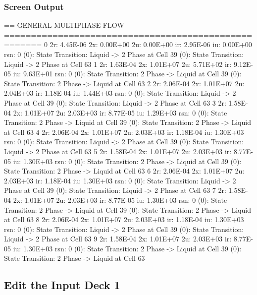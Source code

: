 \documentclass{beamer}
\begin{document}
\begin{frame}[fragile]\frametitle{Screen Output}

\begin{semiverbatim}
\tiny
== GENERAL MULTIPHASE FLOW =====================================================
  0 2r: 4.45E-06 2x: 0.00E+00 2u: 0.00E+00 ir: 2.95E-06 iu: 0.00E+00 rsn:   0
 (0): State Transition: Liquid -> 2 Phase at Cell       39
 (0): State Transition: Liquid -> 2 Phase at Cell       63
  1 2r: 1.63E-04 2x: 1.01E+07 2u: 5.71E+02 ir: 9.12E-05 iu: 9.63E+01 rsn:   0
 (0): State Transition: 2 Phase -> Liquid at Cell       39
 (0): State Transition: 2 Phase -> Liquid at Cell       63
  2 2r: 2.06E-04 2x: 1.01E+07 2u: 2.04E+03 ir: 1.18E-04 iu: 1.44E+03 rsn:   0
 (0): State Transition: Liquid -> 2 Phase at Cell       39
 (0): State Transition: Liquid -> 2 Phase at Cell       63
  3 2r: 1.58E-04 2x: 1.01E+07 2u: 2.03E+03 ir: 8.77E-05 iu: 1.29E+03 rsn:   0
 (0): State Transition: 2 Phase -> Liquid at Cell       39
 (0): State Transition: 2 Phase -> Liquid at Cell       63
  4 2r: 2.06E-04 2x: 1.01E+07 2u: 2.03E+03 ir: 1.18E-04 iu: 1.30E+03 rsn:   0
 (0): State Transition: Liquid -> 2 Phase at Cell       39
 (0): State Transition: Liquid -> 2 Phase at Cell       63
  5 2r: 1.58E-04 2x: 1.01E+07 2u: 2.03E+03 ir: 8.77E-05 iu: 1.30E+03 rsn:   0
 (0): State Transition: 2 Phase -> Liquid at Cell       39
 (0): State Transition: 2 Phase -> Liquid at Cell       63
  6 2r: 2.06E-04 2x: 1.01E+07 2u: 2.03E+03 ir: 1.18E-04 iu: 1.30E+03 rsn:   0
 (0): State Transition: Liquid -> 2 Phase at Cell       39
 (0): State Transition: Liquid -> 2 Phase at Cell       63
  7 2r: 1.58E-04 2x: 1.01E+07 2u: 2.03E+03 ir: 8.77E-05 iu: 1.30E+03 rsn:   0
 (0): State Transition: 2 Phase -> Liquid at Cell       39
 (0): State Transition: 2 Phase -> Liquid at Cell       63
  8 2r: 2.06E-04 2x: 1.01E+07 2u: 2.03E+03 ir: 1.18E-04 iu: 1.30E+03 rsn:   0
 (0): State Transition: Liquid -> 2 Phase at Cell       39
 (0): State Transition: Liquid -> 2 Phase at Cell       63
  9 2r: 1.58E-04 2x: 1.01E+07 2u: 2.03E+03 ir: 8.77E-05 iu: 1.30E+03 rsn:   0
 (0): State Transition: 2 Phase -> Liquid at Cell       39
 (0): State Transition: 2 Phase -> Liquid at Cell       63

\end{semiverbatim}


\end{frame}

\subsection{Edit the Input Deck 1}
\end{document}
